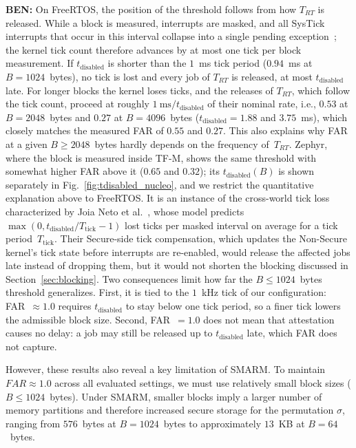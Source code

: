 \documentclass{ieeeaccess}
\DeclareRobustCommand{\ben}[1]{{\color{BENcolor}\textbf{BEN:} #1}}
\begin{document}
\ben{On FreeRTOS, the position of the threshold follows from how $T_{RT}$ is released.
While a block is measured, interrupts are masked, and all SysTick interrupts that occur in this interval collapse into a single pending exception~\cite{armv8m-arm}; the kernel tick count therefore advances by at most one tick per block measurement.
If $t_{\text{disabled}}$ is shorter than the $1$~ms tick period ($0.94$~ms at $B = 1024$~bytes), no tick is lost and every job of $T_{RT}$ is released, at most $t_{\text{disabled}}$ late.
For longer blocks the kernel loses ticks, and the releases of $T_{RT}$, which follow the tick count, proceed at roughly $1~\text{ms}/t_{\text{disabled}}$ of their nominal rate, i.e., $0.53$ at $B = 2048$~bytes and $0.27$ at $B = 4096$~bytes ($t_{\text{disabled}} = 1.88$ and $3.75$~ms), which closely matches the measured FAR of $0.55$ and $0.27$.
This also explains why FAR at a given $B \ge 2048$~bytes hardly depends on the frequency of~$T_{RT}$.
Zephyr, where the block is measured inside TF-M, shows the same threshold with somewhat higher FAR above it ($0.65$ and $0.32$); its $t_{\text{disabled}}(B)$ is shown separately in Fig.~\ref{fig:tdisabled_nucleo}, and we restrict the quantitative explanation above to FreeRTOS.
It is an instance of the cross-world tick loss characterized by Joia Neto et al.~\cite{joianeto2026timekeeping}, whose model predicts $\max(0, t_{\text{disabled}}/T_{\text{tick}} - 1)$ lost ticks per masked interval on average for a tick period~$T_{\text{tick}}$.
Their Secure-side tick compensation, which updates the Non-Secure kernel's tick state before interrupts are re-enabled, would release the affected jobs late instead of dropping them, but it would not shorten the blocking discussed in Section~\ref{sec:blocking}.
Two consequences limit how far the $B \le 1024$~bytes threshold generalizes.
First, it is tied to the $1$~kHz tick of our configuration: FAR~$\approx 1.0$ requires $t_{\text{disabled}}$ to stay below one tick period, so a finer tick lowers the admissible block size.
Second, FAR~$= 1.0$ does not mean that attestation causes no delay: a job may still be released up to $t_{\text{disabled}}$ late, which FAR does not capture.}

However, these results also reveal a key limitation of SMARM.
To maintain $FAR \approx 1.0$ across all evaluated settings, we must use relatively small block sizes ($B \leq 1024$~bytes).
Under SMARM, smaller blocks imply a larger number of memory partitions and therefore increased secure storage for the permutation $\sigma$, ranging from $576$~bytes at $B = 1024$~bytes to approximately $13$~KB at $B = 64$~bytes.
\end{document}
